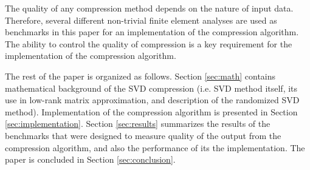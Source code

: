 The quality of any compression method depends on the nature of input data. Therefore, several different non-trivial finite element analyses are used as benchmarks in this paper for an implementation of the compression algorithm. The ability to control the quality of compression is a key requirement for the implementation of the compression algorithm.

The rest of the paper is organized as follows. Section \ref{sec:math} contains mathematical background of the SVD compression (i.e. SVD method itself, its use in low-rank matrix approximation, and description of the randomized SVD method). Implementation of the compression algorithm is presented in Section \ref{sec:implementation}. Section \ref{sec:results} summarizes the results of the benchmarks that were designed to measure quality of the output from the compression algorithm, and also the performance of its the implementation. The paper is concluded in Section \ref{sec:conclusion}.

